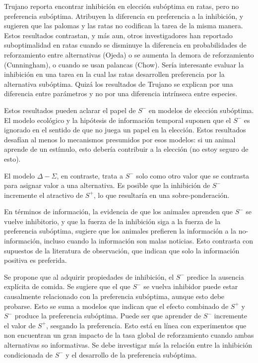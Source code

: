 \documentclass[a4paper,12pt]{article}
\begin{document}
Trujano reporta encontrar inhibición en elección subóptima en ratas, pero no preferencia subóptima.
Atribuyen la diferencia en preferencia a la inhibición, y sugieren que las palomas y las ratas no codifican la tarea de la misma manera.
Estos resultados contrastan, y más aun, otros investigadores han reportado suboptimalidad en ratas cuando se disminuye la diferencia en probabilidades de reforzamiento entre alternativas (Ojeda) o se aumenta la demora de reforzamiento (Cunningham), o cuando se usan palancas (Chow).
Sería interesante evaluar la inhibición en una tarea en la cual las ratas desarrollen preferencia por la alternativa subóptima.
Quizá los resultados de Trujano se explican por una diferencia entre parámetros y no por una diferencia intrínseca entre especies.

Estos resultados pueden aclarar el papel de $S^{-}$ en modelos de elección subóptima.
El modelo ecológico y la hipótesis de información temporal suponen que el $S^{-}$ es ignorado en el sentido de que no juega un papel en la elección.
Estos resultados desafían al menos lo mecanismos presumidos por esos modelos: si un animal aprende de un estímulo, esto debería contribuir a la elección (no estoy seguro de esto).

El modelo $\Delta-\Sigma$, en contraste, trata a $S^{-}$ solo como otro valor que se contrasta para asignar valor a una alternativa.
Es posible que la inhibición de $S^{-}$ incremente el atractivo de $S^{+}$, lo que resultaría en una sobre-ponderación.

En términos de información, la evidencia de que los animales aprenden que $S^{-}$ se vuelve inhibitorio, y que la fuerza de la inhibición siga a la fuerza de la preferencia subóptima, sugiere que los animales prefieren la información a la no-información, incluso cuando la información son malas noticias. 
Esto contrasta con supuestos de la literatura de observación, que indican que solo la información positiva es preferida.

Se propone que al adquirir propiedades de inhibición, el $S^{-}$ predice la ausencia explícita de comida.
Se sugiere que el que $S^{-}$ se vuelva inhibidor puede estar causalmente relacionado con la preferencia subóptima, aunque esto debe probarse.
Esto se suma a modelos que indican que el efecto combinado de $S^{+}$ y $S^{-}$ produce la preferencia subóptima.
Puede ser que aprender de $S^{-}$ incremente el valor de $S^{+}$, sesgando la preferencia.
Esto está en línea con experimentos que non encuentran un gran impacto de la tasa global de reforzamiento cuando ambas alternativas so informativas.
Se debe investigar más la relación entre la inhibición condicionada de $S^{-}$ y el desarrollo de la preferencia subóptima.
\end{document}
